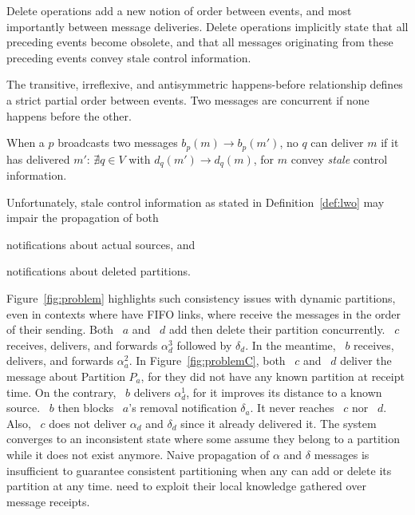 Delete operations add a new notion of order between events, and most
importantly between message deliveries. Delete operations implicitly
state that all preceding events become obsolete, and that all messages
originating from these preceding events convey stale control
information.

\begin{definition}
  The transitive, irreflexive, and antisymmetric happens-before
  relationship defines a strict partial order between events. Two
  messages are concurrent if none happens before the other.
\end{definition}

\begin{definition}
  When a \process $p$ broadcasts two messages $b_p(m) \rightarrow
  b_p(m')$, no \process $q$ can deliver $m$ if it has delivered $m'$:
  $\nexists q \in V$ with $d_q(m') \rightarrow d_q(m)$, for $m$
  convey \emph{stale} control information.
\end{definition}






Unfortunately, stale control information as stated in
Definition~\ref{def:lwo} may impair the propagation of both
\begin{inparaenum}[(i)]
\item notifications about actual sources, and
\item notifications about deleted partitions.
\end{inparaenum}
Figure~\ref{fig:problem} highlights such consistency issues with
dynamic partitions, even in contexts where \processes have FIFO links,
\ie where \processes receive the messages in the order of their
sending. Both \Process~$a$ and \Process~$d$ add then delete their
partition concurrently. \Process~$c$ receives, delivers, and forwards
$\alpha_d^3$ followed by $\delta_d$. In the meantime, \Process~$b$
receives, delivers, and forwards $\alpha_a^2$. In
Figure~\ref{fig:problemC}, both \Process~$c$ and \Process~$d$ deliver
the message about Partition $P_a$, for they did not have any known
partition at receipt time. On the contrary, \Process~$b$ delivers
$\alpha_d^1$, for it improves its distance to a known
source. \Process~$b$ then blocks \Process~$a$'s removal notification
$\delta_a$. It never reaches \Process~$c$ nor \Process~$d$. Also,
\Process~$c$ does not deliver $\alpha_d$ and $\delta_d$ since it
already delivered it. The system converges to an inconsistent state
where some \processes assume they belong to a partition while it does
not exist anymore. Naive propagation of $\alpha$ and $\delta$ messages
is insufficient to guarantee consistent partitioning when any \process
can add or delete its partition at any time. \Processes need to
exploit their local knowledge gathered over message receipts.


